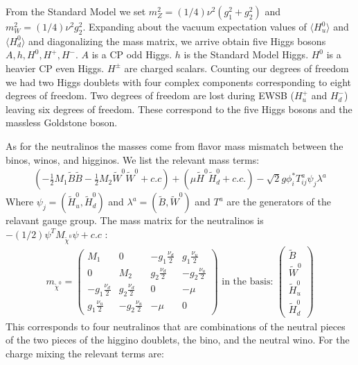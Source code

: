 From the Standard Model we set $m_Z^2 = (1/4)\nu^2(g_1^2 + g_2^2)$ and $m_W^2 = (1/4)\nu^2 g_2^2$. Expanding about the vacuum 
expectation values of $\langle H_u^0 \rangle$ and $\langle H_d^0 \rangle$ and diagonalizing the mass matrix, we arrive obtain five Higgs bosons $A,h,H^0,H^+,H^-$. $A$ is a CP odd Higgs. 
$h$ is the Standard Model Higgs. $H^0$ is a heavier CP even Higgs. $H^\pm$ are charged scalars. 
Counting our degrees of freedom we had two Higgs doublets with four complex components corresponding to eight degrees of freedom. 
Two degrees of freedom are lost during EWSB ($H_u^+$ and $H_d^-$) leaving six degrees of freedom. These correspond to the five Higgs bosons and the massless Goldstone boson.

As for the neutralinos the masses come from flavor mass mismatch between the binos, winos, and higginos. 
We list the relevant mass terms:
\begin{align*}
(-\frac{1}{2}M_1 \tilde{B} \tilde{B} - \frac{1}{2}M_2 \tilde{W}^0 \tilde{W}^0 + c.c) + (\mu \tilde{H}^0 \tilde{H}_d^0 + c.c.) - \sqrt{2}g \phi^*_i T^a_{ij}\psi_j \lambda^a
\end{align*}
Where $\psi_j = (\tilde{H}_u^0, \tilde{H}_d^0)$ and $\lambda^a = ( \tilde{B} , \tilde{W}^0)$ and $T^a$ are
the generators of the relavant gauge group. The mass matrix for the neutralinos is  $-(1/2)\psi^{T} M_{\tilde{\chi}^0} \psi + c.c$ :
\begin{align*}
m_{\tilde{\chi}^0} =
 \begin{pmatrix} 
M_1                  & 0                    & -g_1\frac{\nu_d}{2} & g_1 \frac{\nu_u}{2}  \\
  0                  & M_2                  & g_2\frac{\nu_d}{2}  & -g_2 \frac{\nu_u}{2} \\
 -g_1\frac{\nu_d}{2} & g_2 \frac{\nu_d}{2}  & 0                   & -\mu                 \\
 g_1\frac{\nu_u}{2}  & -g_2 \frac{\nu_u}{2} & -\mu                & 0 
\end{pmatrix} \text{ in the basis: } 
\begin{pmatrix} \tilde{B} \\ \tilde{W}^0 \\ \tilde{H}_u^0 \\ \tilde{H}_d^0 \end{pmatrix}
\end{align*}
This corresponds to four neutralinos that are combinations of the neutral pieces of the two pieces of the 
higgino doublets, the bino, and the neutral wino. For the charge mixing the relevant terms are:
